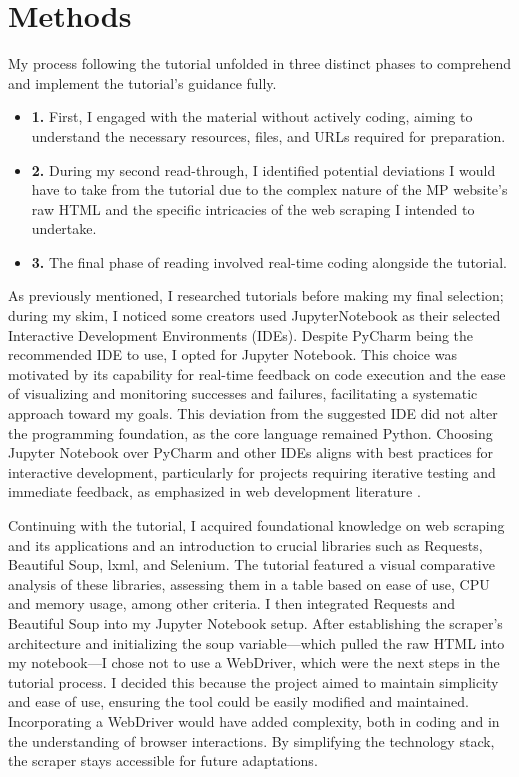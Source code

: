 \documentclass[10pt,twocolumn]{article}
\begin{document}
\section{Methods}
My process following the tutorial unfolded in three distinct phases to comprehend and implement the tutorial's guidance fully.
\begin{itemize}
    \item{
    \textbf{1.} First, I engaged with the material without actively coding, aiming to understand the necessary resources, files, and URLs required for preparation.
    }
    \item{
    \textbf{2.} During my second read-through, I identified potential deviations I would have to take from the tutorial due to the complex nature of the MP website's raw HTML and the specific intricacies of the web scraping I intended to undertake.
    }
     \item{
    \textbf{3.} The final phase of reading involved real-time coding alongside the tutorial.
    }
   
\end{itemize}
As previously mentioned, I researched tutorials before making my final selection; during my skim, I noticed some creators used JupyterNotebook as their selected Interactive Development Environments (IDEs). Despite PyCharm being the recommended IDE to use, I opted for Jupyter Notebook. This choice was motivated by its capability for real-time feedback on code execution and the ease of visualizing and monitoring successes and failures, facilitating a systematic approach toward my goals. This deviation from the suggested IDE did not alter the programming foundation, as the core language remained Python.
Choosing Jupyter Notebook over PyCharm and other IDEs aligns with best practices for interactive development, particularly for projects requiring iterative testing and immediate feedback, as emphasized in web development literature  \cite{Clarke2023JupyterNotebookvs}.

Continuing with the tutorial, I acquired foundational knowledge on web scraping and its applications and an introduction to crucial libraries such as Requests, Beautiful Soup, lxml, and Selenium. The tutorial featured a visual comparative analysis of these libraries, assessing them in a table based on ease of use, CPU and memory usage, among other criteria. I then integrated Requests and Beautiful Soup into my Jupyter Notebook setup.  
After establishing the scraper's architecture and initializing the soup variable—which pulled the raw HTML into my notebook—I chose not to use a WebDriver, which were the next steps in the tutorial process. I decided this because the project aimed to maintain simplicity and ease of use, ensuring the tool could be easily modified and maintained. Incorporating a WebDriver would have added complexity, both in coding and in the understanding of browser interactions. By simplifying the technology stack, the scraper stays accessible for future adaptations. 
\end{document}
